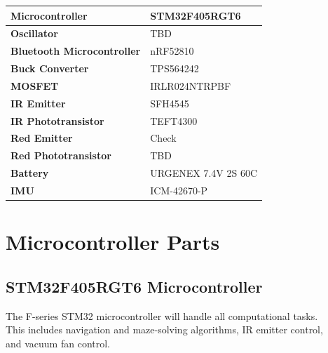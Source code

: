 \documentclass[10pt, letterpaper]{article}
\begin{document}
        \begin{center}
        \begin{tabular}{ll}

            \toprule
            \textbf{Microcontroller} & STM32F405RGT6 \\
            \midrule
            \textbf{Oscillator} & TBD \\
            \midrule
            \textbf{Bluetooth Microcontroller} & nRF52810 \\
            \midrule
            \textbf{Buck Converter} & TPS564242 \\
            \midrule
            \textbf{MOSFET} & IRLR024NTRPBF \\
            \midrule
            \textbf{IR Emitter} & SFH4545 \\
            \midrule
            \textbf{IR Phototransistor} & TEFT4300 \\
            \midrule
            \textbf{Red Emitter} & Check \\
            \midrule
            \textbf{Red Phototransistor} & TBD \\
            \midrule
            \textbf{Battery} & URGENEX 7.4V 2S 60C \\
            \midrule
            \textbf{IMU} & ICM-42670-P  \\
            \bottomrule

        \end{tabular}
        \end{center}


\section{Microcontroller Parts}

    \subsection{STM32F405RGT6 Microcontroller}
        \begin{flushleft}
        
        The F-series STM32 microcontroller will handle all computational tasks. \\
        This includes navigation and maze-solving algorithms, IR emitter control, \\
        and vacuum fan control.
        
        \end{flushleft}
    
\end{document}
